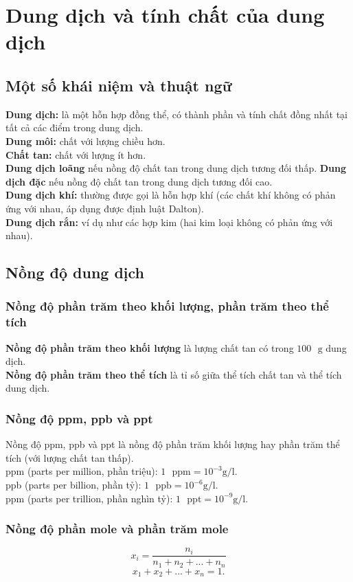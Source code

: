 \chapter{Dung dịch và tính chất của dung dịch}
\section{Một số khái niệm và thuật ngữ}
\textbf{Dung dịch:} là một hỗn hợp đồng thể, có thành phần và tính chất đồng nhất tại tất cả các điểm trong dung dịch.\\
\textbf{Dung môi:} chất với lượng chiều hơn.\\
\textbf{Chất tan:} chất với lượng ít hơn.\\
\textbf{Dung dịch loãng} nếu nồng độ chất tan trong dung dịch tương đối thấp. \textbf{Dung dịch đặc} nếu nồng độ chất tan trong dung dịch tương đối cao.\\
\textbf{Dung dịch khí:} thường được gọi là hỗn hợp khí (các chất khí không có phản ứng với nhau, áp dụng được định luật Dalton).\\
\textbf{Dung dịch rắn:} ví dụ như các hợp kim (hai kim loại không có phản ứng với nhau).
\section{Nồng độ dung dịch}
\subsection{Nồng độ phần trăm theo khối lượng, phần trăm theo thể tích}
\textbf{Nồng độ phần trăm theo khối lượng} là lượng chất tan có trong $100 \text{ } \mathrm{g}$ dung dịch.\\
\textbf{Nồng độ phần trăm theo thể tích} là tỉ số giữa thể tích chất tan và thể tích dung dịch.
\subsection{Nồng độ ppm, ppb và ppt}
Nồng độ ppm, ppb và ppt là nồng độ phần trăm khối lượng hay phần trăm thể tích (với lượng chất tan thấp).\\
ppm (parts per million, phần triệu): $1 \text{ } \mathrm{ppm} = 10^{-3} \mathrm{g/l}.$\\
ppb (parts per billion, phần tỷ): $1 \text{ } \mathrm{ppb} = 10^{-6} \mathrm{g/l}.$\\
ppm (parts per trillion, phần nghìn tỷ): $1 \text{ } \mathrm{ppt} = 10^{-9} \mathrm{g/l}.$
\subsection{Nồng độ phần mole và phần trăm mole}
$$x_i = \frac{n_i}{n_1 + n_2 + ... + n_n}$$
$$x_1 + x_2 + ... + x_n = 1.$$
